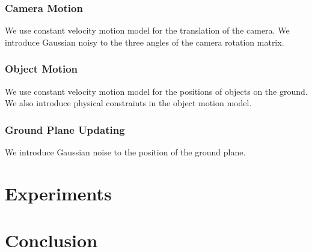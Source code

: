 \documentclass[10pt,column,letterpaper]{article}
\begin{document}
\subsubsection{Camera Motion}

We use constant velocity motion model for the translation of the camera. We introduce Gaussian noisy to the three angles of the camera rotation matrix.

\subsubsection{Object Motion}

We use constant velocity motion model for the positions of objects on the ground. We also introduce physical constraints in the object motion model.

\subsubsection{Ground Plane Updating}

We introduce Gaussian noise to the position of the ground plane.

\section{Experiments}


\section{Conclusion}




\end{document}
